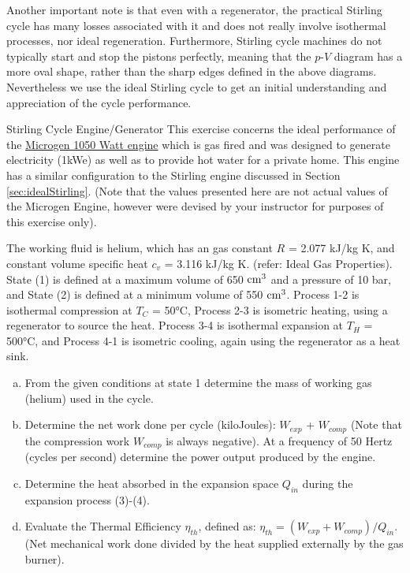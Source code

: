Another important note is that even with a regenerator, the practical Stirling cycle has many losses associated with it and does not really involve isothermal processes, nor ideal regeneration. Furthermore, Stirling cycle machines do not typically start and stop the pistons perfectly, meaning that the $p$-$V$ diagram has a more oval shape, rather than the sharp edges defined in the above diagrams. Nevertheless we use the ideal Stirling cycle to get an initial understanding and appreciation of the cycle performance.
\newpage
\begin{example}{Stirling Cycle Engine/Generator} 
  This exercise concerns the ideal performance of the \href{https://www.microgen-engine.com/engines/}{Microgen 1050 Watt engine} which is gas fired and was designed to generate electricity (1kWe) as well as to provide hot water for a private home. This engine has a similar configuration to the Stirling engine discussed in Section \ref{sec:idealStirling}.  (Note that the values presented here are not actual values of the Microgen Engine, however were devised by your instructor for purposes of this exercise only).

  The working fluid is helium, which has an gas constant $R$ = 2.077 kJ/kg K, and constant volume specific heat $c_v$ = 3.116 kJ/kg K. (refer: Ideal Gas Properties).  State (1) is defined at a maximum volume of 650 $\rm cm^3$ and a pressure of 10 bar, and State (2) is defined at a minimum volume of 550 $\rm cm^3$.  Process 1-2 is isothermal compression at $T_C$ = 50°C, Process 2-3 is isometric heating, using a regenerator to source the heat.  Process 3-4 is isothermal expansion at $T_H$ = 500°C, and Process 4-1 is isometric cooling, again using the regenerator as a heat sink.
  \begin{enumerate}[a)]
  \item From the given conditions at state 1 determine the mass of working gas (helium) used in the cycle.
    
  \item Determine the net work done per cycle (kiloJoules): $W_{exp}$ + $W_{comp}$ (Note that the compression work $W_{comp}$ is always negative). At a frequency of 50 Hertz (cycles per second) determine the power output produced by the engine.
    
  \item Determine the heat absorbed in the expansion space $Q_{in}$ during the expansion process (3)-(4).
    
  \item Evaluate the Thermal Efficiency $\eta_{th}$, defined as: $\eta_{th} = (W_{exp} + W_{comp}) / Q_{in}$. (Net mechanical work done divided by the heat supplied externally by the gas burner).
    

\end{enumerate}
\end{example}
